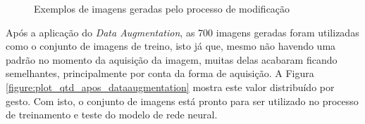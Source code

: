 \begin{figure}[H]%
    \centering
    \caption{Exemplos de imagens geradas pelo processo de modificação}
    \qquad
    \qquad
    \qquad
    \label{figure:gestos_gerados_no_pipeline}
\end{figure}

\par Após a aplicação do \textit{Data Augmentation}, as 700 imagens geradas foram utilizadas como o conjunto de imagens de treino, isto já que, mesmo não havendo uma padrão no momento da aquisição da imagem, muitas delas acabaram ficando semelhantes, principalmente por conta da forma de aquisição. A Figura \ref{figure:plot_qtd_apos_dataaugmentation} mostra este valor distribuído por gesto. Com isto, o conjunto de imagens está pronto para ser utilizado no processo de treinamento e teste do modelo de rede neural.

